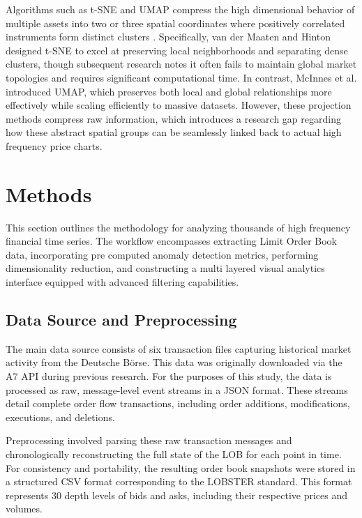 \documentclass[final,3p,times,twocolumn]{elsarticle}
\begin{document}
Algorithms such as t-SNE and UMAP compress the high dimensional behavior of multiple assets into two or three spatial coordinates where positively correlated instruments form distinct clusters \cite{shao2016visual}. Specifically, van der Maaten and Hinton \cite{vandermaaten2008visualizing} designed t-SNE to excel at preserving local neighborhoods and separating dense clusters, though subsequent research notes it often fails to maintain global market topologies and requires significant computational time. In contrast, McInnes et al. \cite{mcinnes2018umap} introduced UMAP, which preserves both local and global relationships more effectively while scaling efficiently to massive datasets. However, these projection methods compress raw information, which introduces a research gap regarding how these abstract spatial groups can be seamlessly linked back to actual high frequency price charts.

\section{Methods}\label{sec:methods}
This section outlines the methodology for analyzing thousands of high frequency financial time series. The workflow encompasses extracting Limit Order Book data, incorporating pre computed anomaly detection metrics, performing dimensionality reduction, and constructing a multi layered visual analytics interface equipped with advanced filtering capabilities.

\subsection{Data Source and Preprocessing}\label{sec:data}

The main data source consists of six transaction files capturing historical market activity from the Deutsche Börse. This data was originally downloaded via the A7 API during previous research. For the purposes of this study, the data is processed as raw, message-level event streams in a JSON format. These streams detail complete order flow transactions, including order additions, modifications, executions, and deletions. 

Preprocessing involved parsing these raw transaction messages and chronologically reconstructing the full state of the LOB for each point in time. For consistency and portability, the resulting order book snapshots were stored in a structured CSV format corresponding to the LOBSTER standard. This format represents 30 depth levels of bids and asks, including their respective prices and volumes.
\end{document}
